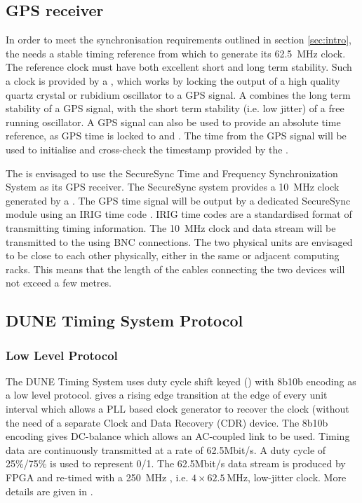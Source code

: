 \documentclass{dune}
\begin{document}
\subsection{GPS receiver}
In order to meet the synchronisation requirements outlined in section \ref{sec:intro}, the  needs a stable timing reference from which to generate its \SI{62.5}{\MHz} clock. The reference clock must have both excellent short and long term stability. Such a clock is provided by a , which works by locking the output of a high quality quartz crystal or rubidium oscillator to a GPS signal. A  combines the long term stability of a GPS signal, with the short term stability (i.e. low jitter) of a free running oscillator. A GPS signal can also be used to provide an absolute time reference, as GPS time is locked to  and . The time from the GPS signal will be used to initialise and cross-check the timestamp provided by the .

The  is envisaged to use the SecureSync Time and Frequency Synchronization System \cite{secure_sync_datasheet} as its GPS receiver. The SecureSync system provides a \SI{10}{\MHz} clock generated by a . The GPS time signal will be output by a dedicated SecureSync module \cite{secure_sync_modules} using an IRIG time code \cite{irig}. IRIG time codes are a standardised format of transmitting timing information. The \SI{10}{\MHz} clock and  data stream will be transmitted to the  using BNC connections. The two physical units are envisaged to be close to each other physically, either in the same or adjacent computing racks. This means that the length of the cables connecting the two devices will not exceed a few metres.

\subsection{DUNE Timing System Protocol}

\subsubsection{Low Level Protocol}

The DUNE Timing System uses duty cycle shift keyed () with 8b10b encoding as a low level protocol.   gives a rising edge transition at the edge of every unit interval which allows a PLL based clock generator to recover the clock (without the need of a separate Clock and Data Recovery (CDR) device. The 8b10b encoding gives DC-balance which allows an AC-coupled link to be used. Timing data are continuously transmitted at a rate of 62.5Mbit/s. A duty cycle of 25\%/75\% is used to represent 0/1. The 62.5Mbit/s data stream is produced by FPGA and re-timed with a \SI{250}{MHz} , i.e. $4 \times \SI{62.5}{\MHz}$, low-jitter clock. More details are given in \cite{2210.15517}. 
\end{document}
